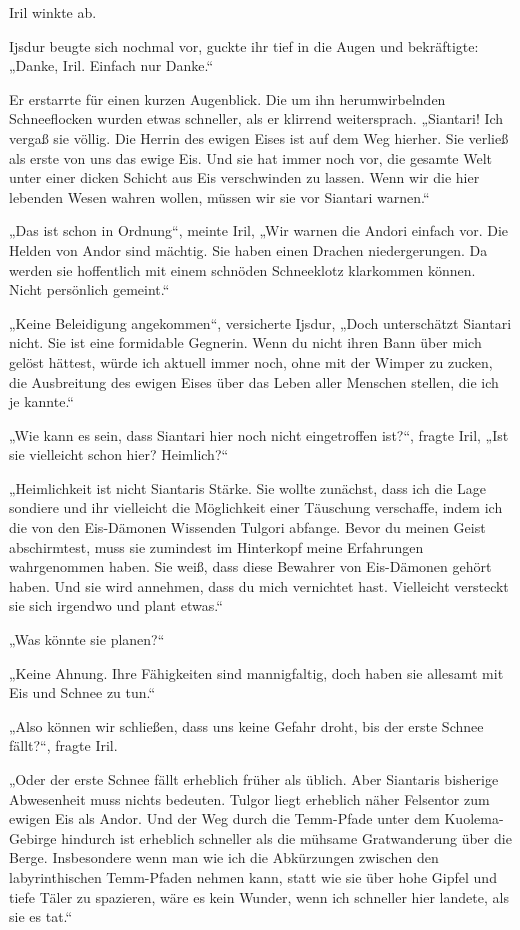 Iril winkte ab.

Ijsdur beugte sich nochmal vor, guckte ihr tief in die Augen und bekräftigte: „Danke, Iril. Einfach nur Danke.“

Er erstarrte für einen kurzen Augenblick. Die um ihn herumwirbelnden Schneeflocken wurden etwas schneller, als er klirrend weitersprach. „Siantari! Ich vergaß sie völlig. Die Herrin des ewigen Eises ist auf dem Weg hierher. Sie verließ als erste von uns das ewige Eis. Und sie hat immer noch vor, die gesamte Welt unter einer dicken Schicht aus Eis verschwinden zu lassen. Wenn wir die hier lebenden Wesen wahren wollen, müssen wir sie vor Siantari warnen.“

„Das ist schon in Ordnung“, meinte Iril, „Wir warnen die Andori einfach vor. Die Helden von Andor sind mächtig. Sie haben einen Drachen niedergerungen. Da werden sie hoffentlich mit einem schnöden Schneeklotz klarkommen können. Nicht persönlich gemeint.“

„Keine Beleidigung angekommen“, versicherte Ijsdur, „Doch unterschätzt Siantari nicht. Sie ist eine formidable Gegnerin. Wenn du nicht ihren Bann über mich gelöst hättest, würde ich aktuell immer noch, ohne mit der Wimper zu zucken, die Ausbreitung des ewigen Eises über das Leben aller Menschen stellen, die ich je kannte.“

„Wie kann es sein, dass Siantari hier noch nicht eingetroffen ist?“, fragte Iril, „Ist sie vielleicht schon hier? Heimlich?“

„Heimlichkeit ist nicht Siantaris Stärke. Sie wollte zunächst, dass ich die Lage sondiere und ihr vielleicht die Möglichkeit einer Täuschung verschaffe, indem ich die von den Eis-Dämonen Wissenden Tulgori abfange. Bevor du meinen Geist abschirmtest, muss sie zumindest im Hinterkopf meine Erfahrungen wahrgenommen haben. Sie weiß, dass diese Bewahrer von Eis-Dämonen gehört haben. Und sie wird annehmen, dass du mich vernichtet hast. Vielleicht versteckt sie sich irgendwo und plant etwas.“

„Was könnte sie planen?“

„Keine Ahnung. Ihre Fähigkeiten sind mannigfaltig, doch haben sie allesamt mit Eis und Schnee zu tun.“

„Also können wir schließen, dass uns keine Gefahr droht, bis der erste Schnee fällt?“, fragte Iril.

„Oder der erste Schnee fällt erheblich früher als üblich. Aber Siantaris bisherige Abwesenheit muss nichts bedeuten. Tulgor liegt erheblich näher Felsentor zum ewigen Eis als Andor. Und der Weg durch die Temm-Pfade unter dem Kuolema-Gebirge hindurch ist erheblich schneller als die mühsame Gratwanderung über die Berge. Insbesondere wenn man wie ich die Abkürzungen zwischen den labyrinthischen Temm-Pfaden nehmen kann, statt wie sie über hohe Gipfel und tiefe Täler zu spazieren, wäre es kein Wunder, wenn ich schneller hier landete, als sie es tat.“

